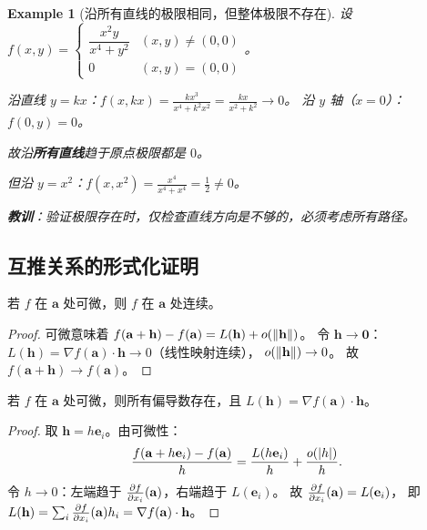 \documentclass{ctexart}
\newtheorem{example}[theorem]{Example}
\begin{document}
\begin{example}[沿所有直线的极限相同，但整体极限不存在]
  设
  $f(x,y) = \begin{cases} \dfrac{x^2 y}{x^4+y^2} & (x,y) \ne (0,0) \\ 0 & (x,y) = (0,0) \end{cases}$。

  沿直线 $y = kx$：$f(x,kx) = \frac{kx^3}{x^4+k^2x^2} = \frac{kx}{x^2+k^2} \to 0$。
  沿 $y$ 轴（$x=0$）：$f(0,y) = 0$。

  故沿\textbf{所有直线}趋于原点极限都是 $0$。

  但沿 $y = x^2$：$f(x,x^2) = \frac{x^4}{x^4+x^4} = \frac{1}{2} \ne 0$。

  \textbf{教训}：验证极限存在时，仅检查直线方向是不够的，必须考虑所有路径。
\end{example}

\subsection{互推关系的形式化证明}

\begin{theorem}[可微 $\Rightarrow$ 连续]
  \label{thm:diff-cont}
  若 $f$ 在 $\mathbf{a}$ 处可微，则 $f$ 在 $\mathbf{a}$ 处连续。
\end{theorem}

\begin{proof}
  可微意味着 $f(\mathbf{a}+\mathbf{h}) - f(\mathbf{a}) = L(\mathbf{h}) + o(\left\| \mathbf{h} \right\|)$。
  令 $\mathbf{h} \to \mathbf{0}$：
  $L(\mathbf{h}) = \nabla f(\mathbf{a}) \cdot \mathbf{h} \to 0$（线性映射连续），
  $o(\left\| \mathbf{h} \right\|) \to 0$。
  故 $f(\mathbf{a}+\mathbf{h}) \to f(\mathbf{a})$。
\end{proof}

\begin{theorem}
  \label{thm:diff-pde}
  若 $f$ 在 $\mathbf{a}$ 处可微，则所有偏导数存在，且
  $L(\mathbf{h}) = \nabla f(\mathbf{a}) \cdot \mathbf{h}$。
\end{theorem}

\begin{proof}
  取 $\mathbf{h} = h\mathbf{e}_i$。由可微性：
  \[
    \frac{f(\mathbf{a}+h\mathbf{e}_i) - f(\mathbf{a})}{h}
    = \frac{L(h\mathbf{e}_i)}{h} + \frac{o(\left| h \right|)}{h}.
  \]
  令 $h \to 0$：左端趋于 $\frac{\partial f}{\partial x_i}(\mathbf{a})$，右端趋于 $L(\mathbf{e}_i)$。
  故 $\frac{\partial f}{\partial x_i}(\mathbf{a}) = L(\mathbf{e}_i)$，
  即 $L(\mathbf{h}) = \sum_i \frac{\partial f}{\partial x_i}(\mathbf{a}) h_i = \nabla f(\mathbf{a}) \cdot \mathbf{h}$。
\end{proof}
\end{document}
